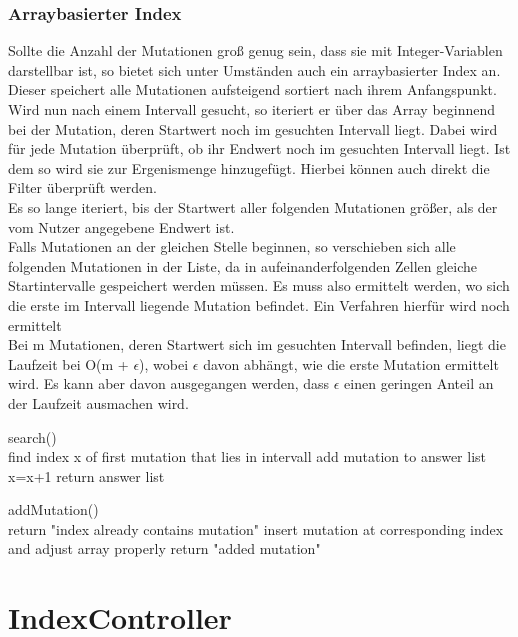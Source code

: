 \documentclass[]{article}
\begin{document}
\subsubsection{Arraybasierter Index}
Sollte die Anzahl der Mutationen groß genug sein, dass sie mit Integer-Variablen darstellbar ist, so bietet sich unter Umständen auch ein arraybasierter Index an.\\
Dieser speichert alle Mutationen aufsteigend sortiert nach ihrem Anfangspunkt.
Wird nun nach einem Intervall gesucht, so iteriert er über das Array beginnend bei der Mutation, deren Startwert noch im gesuchten Intervall liegt. Dabei wird für jede Mutation überprüft, ob ihr Endwert noch im gesuchten Intervall liegt. Ist dem so wird sie zur Ergenismenge hinzugefügt. Hierbei können auch direkt die Filter überprüft werden.\\
Es so lange iteriert, bis der Startwert aller folgenden Mutationen größer, als der vom Nutzer angegebene Endwert ist.\\
Falls Mutationen an der gleichen Stelle beginnen, so verschieben sich alle folgenden Mutationen in der Liste, da in aufeinanderfolgenden Zellen gleiche Startintervalle gespeichert werden müssen. Es muss also ermittelt werden, wo sich die erste im Intervall liegende Mutation befindet. Ein Verfahren hierfür wird noch ermittelt\\
Bei m Mutationen, deren Startwert sich im gesuchten Intervall befinden, liegt die Laufzeit bei O(m + $\epsilon$), wobei $\epsilon$ davon abhängt, wie die erste Mutation ermittelt wird. Es kann aber davon ausgegangen werden, dass $\epsilon$ einen geringen Anteil an der Laufzeit ausmachen wird.
\begin{algorithm}
search()\\{
find index x of first mutation that lies in intervall\;
{{
{add mutation to answer list\;}
}
x=x+1\;
}
return answer list\;}

\end{algorithm}


\begin{algorithm}
addMutation()\\{
{return "index already contains mutation"\;}
insert mutation at corresponding index and adjust array properly\;
return "added mutation"\;}
\end{algorithm}
\newpage
\section{IndexController}
\end{document}
